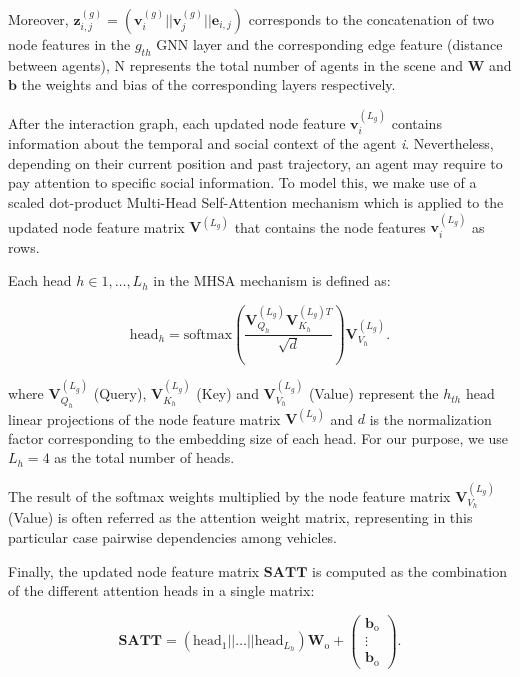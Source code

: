 Moreover, $\mathbf{z}_{i,j}^{(g)} = ( \mathbf{v}_i^{(g)} || \mathbf{v}_j^{(g)} ||\mathbf{e}_{i,j} )$ corresponds to the concatenation of two node features in the \textit{$g_{th}$} GNN layer and the corresponding edge feature (distance between agents), N represents the total number of agents in the scene and $\mathbf{W}$ and $\mathbf{b}$ the weights and bias of the corresponding layers respectively.

After the interaction graph, each updated node feature $\mathbf{v}_i^{(L_g)}$ contains information about the temporal and social context of the agent \textit{i}. Nevertheless, depending on their current position and past trajectory, an agent may require to pay attention to specific social information. To model this, we make use of a scaled dot-product Multi-Head Self-Attention mechanism \cite{vaswani2017attention} which is applied to the updated node feature matrix $\mathbf{V}^{(L_g)}$ that contains the node features $\mathbf{v}_i^{(L_g)}$ as rows. 

Each head $h \in 1,\dots, L_h$ in the MHSA mechanism is defined as:

\begin{equation}
	\mathrm{head}_h = \mathrm{softmax} \left( \frac{\mathbf{V}^{(L_g)}_{Q_h} \mathbf{V}^{(L_g) T}_{K_h}}{\sqrt{d}}  \right) \mathbf{V}^{(L_g)}_{V_h} \text{.}
\end{equation}

where $\mathbf{V}^{(L_g)}_{Q_h}$ (Query), $\mathbf{V}^{(L_g)}_{K_h}$ (Key) and $\mathbf{V}^{(L_g)}_{V_h}$ (Value) represent the \textit{$h_{th}$} head linear projections of the node feature matrix $\mathbf{V}^{(L_g)}$ and $d$ is the normalization factor corresponding to the embedding size of each head. For our purpose, we use $L_h = 4$ as the total number of heads. 

The result of the softmax weights multiplied by the node feature matrix $\mathbf{V}^{(L_g)}_{V_h}$ (Value) is often referred as the attention weight matrix, representing in this particular case pairwise dependencies among vehicles.

Finally, the updated node feature matrix $\mathbf{SATT}$ is computed as the combination of the different attention heads in a single matrix:

\begin{equation}
	\mathbf{SATT} = (\mathrm{head}_1 || \dots || \mathrm{head}_{L_h}) \mathbf{W}_\mathrm{o} + 
	\begin{pmatrix}
		\mathbf{b}_\mathrm{o}\\
		\vdots \\
		\mathbf{b}_\mathrm{o}
	\end{pmatrix}.
\end{equation}

